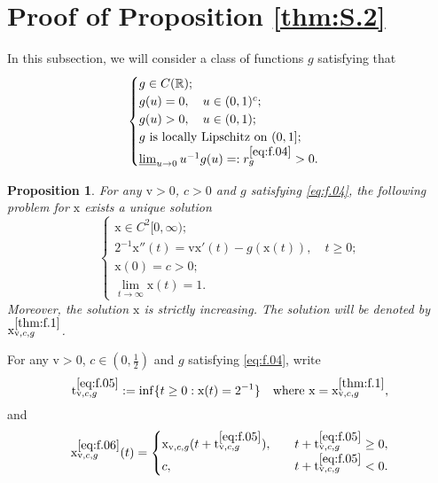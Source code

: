 \documentclass[12pt,a4paper]{amsart}
\numberwithin{equation}{section}
\theoremstyle{plain}
\newtheorem{proposition}[theorem]{Proposition}
\theoremstyle{remark}
\begin{document}
\section{Proof of Proposition \ref{thm:S.2}} \label{sec:f}
In this subsection, we will consider a class of functions $g$ satisfying that
\begin{equation} \label{eq:f.04}
\begin{cases}
g \in C(\mathbb R); 
\\ g(u)  = 0, \quad u \in (0,1)^c; 
\\ g(u)>0, \quad  u \in (0,1); 
\\ g \text{~is locally Lipschitz on $(0,1]$};
\\ \varliminf_{u \to 0} u^{-1}g(u) =: r_g^{\eqref{eq:f.04}} > 0.	 
\end{cases}
\end{equation}
\begin{proposition} \label{thm:f.1}
	For any $\mathrm v>0$, $c>0$ and $g$ satisfying \eqref{eq:f.04}, the following problem for $\mathrm x$ exists a unique solution 
	\begin{equation}
	\begin{cases}
	\mathrm x \in C^2[0,\infty);
	\\ 2^{-1} \mathrm x''(t) = \mathrm v \mathrm x'(t) - g\left(\mathrm x(t)\right), \quad t \geq 0;
	\\ \mathrm x(0)= c>0;
	\\ \lim_{t\to \infty}\mathrm x(t) = 1.
	\end{cases}
	\end{equation}
	Moreover, the solution $\mathrm x$ is strictly increasing.
	The solution will be denoted by $\mathrm x_{\mathrm v, c, g}^{\ref{thm:f.1}}$.
\end{proposition}

For any $\mathrm v>0$, $c\in (0,\frac{1}{2})$ and $g$ satisfying \eqref{eq:f.04}, write
\begin{equation} \label{eq:f.05}
\mathrm t_{\mathrm v, c, g}^{\eqref{eq:f.05}} := \inf\{t \geq 0: \mathrm x(t) = 2^{-1}\} \quad \text{where } \mathrm x = \mathrm x_{\mathrm v, c, g}^{\ref{thm:f.1}},
\end{equation}
and 
\begin{equation} \label{eq:f.06}
\mathrm x_{\mathrm v, c, g}^{\eqref{eq:f.06}}(t) =
\begin{cases}
\mathrm x_{\mathrm v, c, g} (t + \mathrm t_{\mathrm v, c, g}^{\eqref{eq:f.05}}), \quad & t + \mathrm t_{\mathrm v, c, g}^{\eqref{eq:f.05}} \geq 0,
\\
c, \quad &t + \mathrm t_{\mathrm v, c, g}^{\eqref{eq:f.05}} < 0.
\end{cases}
\end{equation}
\end{document}
